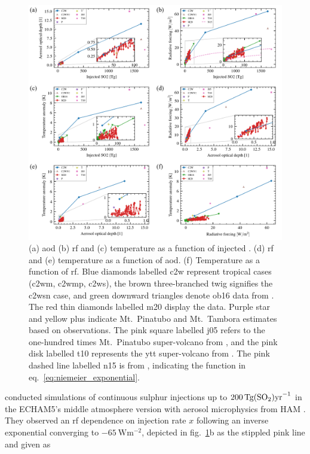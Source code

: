 \documentclass{ametsocV6.1}
\newcommand{\iso}[1][i]{{#1}njected \ce{SO2}}
\begin{document}
\begin{figure}
  \centering
  \includegraphics{figures/figure4.png}

  \caption{(a) \gls{aod} (b) \gls{rf} and (c) temperature as a function of \iso{}\@. (d)
    \gls{rf} and (e) temperature as a function of \gls{aod}. (f) Temperature as a function
    of \gls{rf}. Blue diamonds labelled \gls{c2w} represent tropical cases (\gls{c2wm},
    \gls{c2wmp}, \gls{c2ws}), the brown three-branched twig signifies the \gls{c2wsn} case,
    and green downward triangles denote \gls{ob16} data from \citet{ottobliesner2016}. The
    red thin diamonds labelled \gls{m20} display the \citet{marshall2020dataset} data.
    Purple star and yellow plus indicate Mt.\ Pinatubo and Mt.\ Tambora estimates based on
    observations. The pink square labelled \gls{j05} refers to the one-hundred times Mt.\
    Pinatubo super-volcano from \citet{jones2005}, and the pink disk labelled \gls{t10}
    represents the \gls{ytt} super-volcano from \citet{timmreck2010}. The pink dashed line
    labelled \gls{n15} is from \citet{niemeier2015}, indicating the function in
    eq.~\ref{eq:niemeier_exponential}.}\label{fig:parameter_scan}%
\end{figure}

\citet{niemeier2015} conducted simulations of continuous sulphur injections up to
\(\SI{200}{\tera\gram(\ce{SO2})\mathrm{yr}^{-1}}\) in the ECHAM5's middle atmosphere
version \citep{giorgetta2006} with aerosol microphysics from HAM \citep{stier2005}. They
observed an \gls{rf} dependence on injection rate \(x\) following an inverse exponential
converging to \(\SI{-65}{\watt\meter^{-2}}\), depicted in fig.~\ref{fig:parameter_scan}b
as the stippled pink line and given as
\end{document}
